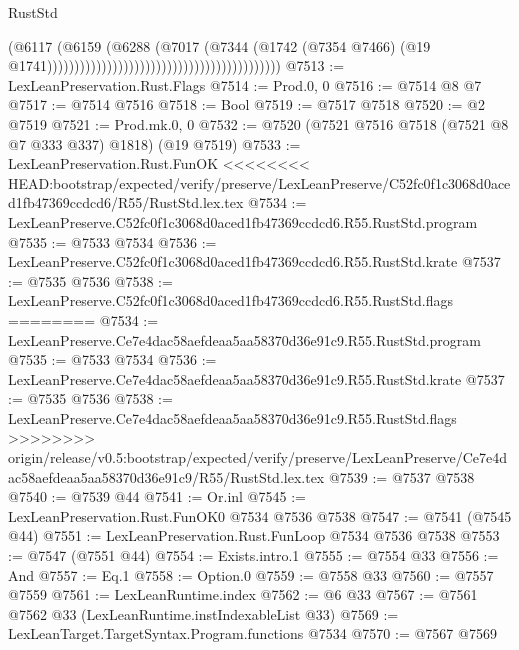 \begin{lexlean}{RustStd}
\begin{coremodule}
{\begin{coremodule}
{{{{{{{{{{{{{{{{{{{{{{{{{{{{{{{{{{{{{{{{{{{                                                                            (@6117
                                                                              (@6159
                                                                                (@6288
                                                                                  (@7017
                                                                                    (@7344
                                                                                      (@1742
                                                                                        (@7354
                                                                                          @7466)
                                                                                        (@19
                                                                                          @1741)))))))))))))))))))))))))))))))))))))))))))
@7513 := LexLeanPreservation.Rust.Flags
@7514 := Prod.{0, 0}
@7516 := @7514 @8 @7
@7517 := @7514 @7516
@7518 := Bool
@7519 := @7517 @7518
@7520 := @2 @7519
@7521 := Prod.mk.{0, 0}
@7532 := @7520 (@7521 @7516 @7518 (@7521 @8 @7 @333 @337) @1818) (@19 @7519)
@7533 := LexLeanPreservation.Rust.FunOK
<<<<<<<< HEAD:bootstrap/expected/verify/preserve/LexLeanPreserve/C52fc0f1c3068d0aced1fb47369ccdcd6/R55/RustStd.lex.tex
@7534 := LexLeanPreserve.C52fc0f1c3068d0aced1fb47369ccdcd6.R55.RustStd.program
@7535 := @7533 @7534
@7536 := LexLeanPreserve.C52fc0f1c3068d0aced1fb47369ccdcd6.R55.RustStd.krate
@7537 := @7535 @7536
@7538 := LexLeanPreserve.C52fc0f1c3068d0aced1fb47369ccdcd6.R55.RustStd.flags
========
@7534 := LexLeanPreserve.Ce7e4dac58aefdeaa5aa58370d36e91c9.R55.RustStd.program
@7535 := @7533 @7534
@7536 := LexLeanPreserve.Ce7e4dac58aefdeaa5aa58370d36e91c9.R55.RustStd.krate
@7537 := @7535 @7536
@7538 := LexLeanPreserve.Ce7e4dac58aefdeaa5aa58370d36e91c9.R55.RustStd.flags
>>>>>>>> origin/release/v0.5:bootstrap/expected/verify/preserve/LexLeanPreserve/Ce7e4dac58aefdeaa5aa58370d36e91c9/R55/RustStd.lex.tex
@7539 := @7537 @7538
@7540 := @7539 @44
@7541 := Or.inl
@7545 := LexLeanPreservation.Rust.FunOK0 @7534 @7536 @7538
@7547 := @7541 (@7545 @44)
@7551 := LexLeanPreservation.Rust.FunLoop @7534 @7536 @7538
@7553 := @7547 (@7551 @44)
@7554 := Exists.intro.{1}
@7555 := @7554 @33
@7556 := And
@7557 := Eq.{1}
@7558 := Option.{0}
@7559 := @7558 @33
@7560 := @7557 @7559
@7561 := LexLeanRuntime.index
@7562 := @6 @33
@7567 := @7561 @7562 @33 (LexLeanRuntime.instIndexableList @33)
@7569 := LexLeanTarget.TargetSyntax.Program.functions @7534
@7570 := @7567 @7569
}}}}}}}}}}}}}}}}}}}}}}}}}}}}}}}}}}}}}}}}}}}
\end{coremodule}}
\end{coremodule}
\end{lexlean}
